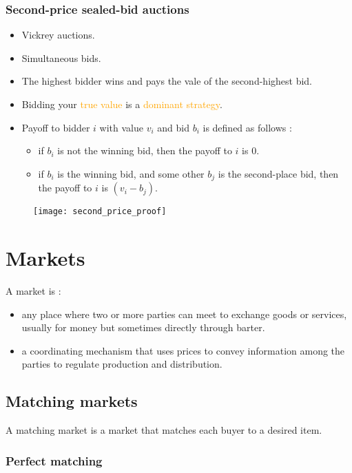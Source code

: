 \subsection{Second-price sealed-bid auctions}

\begin{itemize}
\item Vickrey auctions.
\item Simultaneous bids.
\item The highest bidder wins and pays the vale of the second-highest bid.
\item Bidding your \textcolor{orange}{true value} is a \textcolor{orange}{dominant strategy}.
\item Payoff to bidder $i$ with value $v_i$ and bid $b_i$ is defined as follows :
	\begin{itemize}
	\item if $b_i$ is not the winning bid, then the payoff to $i$ is $0$.
	\item if $b_i$ is the winning bid, and some other $b_j$ is the second-place bid, then the payoff to $i$ is $(v_i - b_j)$.
	\end{itemize}
\end{itemize}

\begin{figure}[H]
    \centering
    \texttt{[image: second\_price\_proof]}
\end{figure}

\chapter{Markets}

A market is :
\begin{itemize}
\item any place where two or more parties can meet to exchange goods or services, usually for money but sometimes directly through barter.
\item a coordinating mechanism that uses prices to convey information among the parties to regulate production and distribution.
\end{itemize}

\section{Matching markets}

A matching market is a market that matches each buyer to a desired item.

\subsection{Perfect matching}

